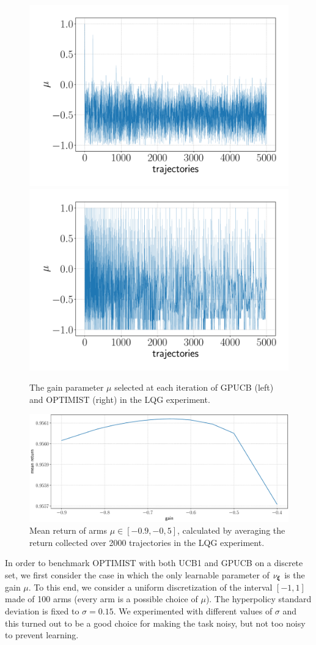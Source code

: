 \begin{figure}[t!] 
\includegraphics[width=.5\textwidth]{Images/LQG_GPUCB_mu.pdf}\hfill
\includegraphics[width=.5\textwidth]{Images/LQG_OPTIMIST_mu.pdf}\hfill
\caption{The gain parameter $\mu$ selected at each iteration of \gls{GPUCB} (left) and \gls{OPTIMIST} (right) in the \gls{LQG} experiment.}
\label{fig:LQGmu}
\end{figure}


\begin{figure}[t!]
\centering
\includegraphics[width=.75\textwidth,keepaspectratio]{Images/LQG_optimal_gain.pdf}
\caption{Mean return of arms $\mu\in[-0.9,-0,5]$, calculated by averaging the return collected over 2000 trajectories in the \gls{LQG} experiment.}
\label{fig:LQGoptimalgain}
\end{figure}

In order to benchmark \gls{OPTIMIST} with both \gls{UCB}1 and \gls{GPUCB} on a discrete set, we first consider the case in which the only learnable parameter of $\nu_{\boldsymbol{\xi}}$ is the gain $\mu$. To this end, we consider a uniform discretization of the interval $[-1,1]$ made of 100 arms (every arm is a possible choice of $\mu$). The hyperpolicy standard deviation is fixed to $\sigma=0.15$. We experimented with different values of $\sigma$ and this turned out to be a good choice for making the task noisy, but not too noisy to prevent learning.


